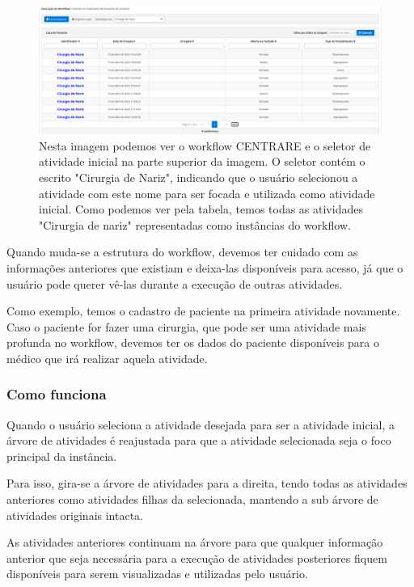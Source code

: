 \begin{figure}
    \centering
    \includegraphics[width=1\textwidth]{imgs/CENTRARE/instanciaAlterada.png}
    \caption{Nesta imagem podemos ver o workflow CENTRARE e o seletor de atividade inicial na parte superior da imagem. O seletor contém o escrito "Cirurgia de Nariz", indicando que o usuário selecionou a atividade com este nome para ser focada e utilizada como atividade inicial. Como podemos ver pela tabela, temos todas as atividades "Cirurgia de nariz" representadas como instâncias do workflow.}
    \label{fig:centrare_seletor_alterado}
\end{figure}

Quando muda-se a estrutura do workflow, devemos ter cuidado com as informações anteriores que existiam e deixa-las disponíveis para acesso, já que o usuário pode querer vê-las durante a execução de outras atividades.

Como exemplo, temos o cadastro de paciente na primeira atividade novamente. Caso o paciente for fazer uma cirurgia, que pode ser uma atividade mais profunda no workflow, devemos ter os dados do paciente disponíveis para o médico que irá realizar aquela atividade.

\subsubsection{Como funciona}

Quando o usuário seleciona a atividade desejada para ser a atividade inicial, a árvore de atividades é reajustada para que a atividade selecionada seja o foco principal da instância.

Para isso, gira-se a árvore de atividades para a direita, tendo todas as atividades anteriores como atividades filhas da selecionada, mantendo a sub árvore de atividades originais intacta.

As atividades anteriores continuam na árvore para que qualquer informação anterior que seja necessária para a execução de atividades posteriores fiquem disponíveis para serem visualizadas e utilizadas pelo usuário.

